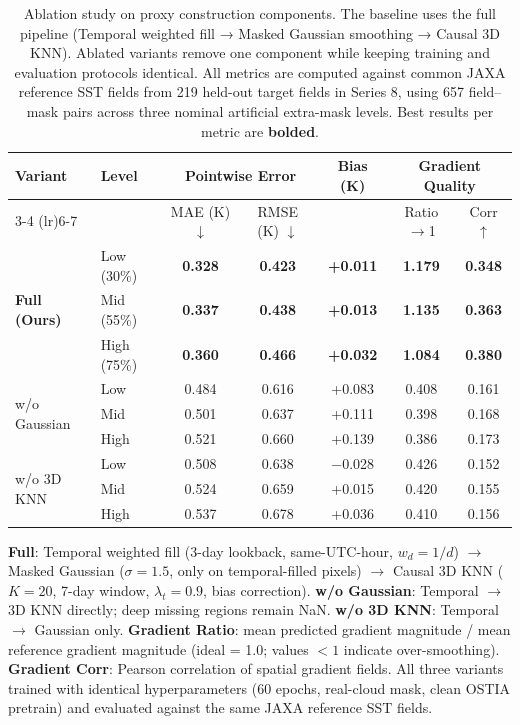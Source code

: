 
\begin{table}[htbp]
\centering
\caption{Ablation study on proxy construction components. The baseline uses the full pipeline (Temporal weighted fill → Masked Gaussian smoothing → Causal 3D KNN). Ablated variants remove one component while keeping training and evaluation protocols identical. All metrics are computed against common JAXA reference SST fields from 219 held-out target fields in Series 8, using 657 field--mask pairs across three nominal artificial extra-mask levels. Best results per metric are \textbf{bolded}.}
\label{tab:proxy_ablation}
\small
\begin{tabular}{@{}llccccc@{}}
\toprule
\multirow{2}{*}{Variant} & \multirow{2}{*}{Level} & \multicolumn{2}{c}{Pointwise Error} & \multirow{2}{*}{Bias (K)} & \multicolumn{2}{c}{Gradient Quality} \\
\cmidrule(lr){3-4} \cmidrule(lr){6-7}
& & MAE (K) $\downarrow$ & RMSE (K) $\downarrow$ & & Ratio $\to$1 & Corr $\uparrow$ \\
\midrule
\multirow{3}{*}{\textbf{Full (Ours)}}
& Low (30\%)  & \textbf{0.328} & \textbf{0.423} & \textbf{+0.011} & \textbf{1.179} & \textbf{0.348} \\
& Mid (55\%)  & \textbf{0.337} & \textbf{0.438} & \textbf{+0.013} & \textbf{1.135} & \textbf{0.363} \\
& High (75\%) & \textbf{0.360} & \textbf{0.466} & \textbf{+0.032} & \textbf{1.084} & \textbf{0.380} \\
\midrule
\multirow{3}{*}{w/o Gaussian}
& Low  & 0.484 & 0.616 & +0.083 & 0.408 & 0.161 \\
& Mid  & 0.501 & 0.637 & +0.111 & 0.398 & 0.168 \\
& High & 0.521 & 0.660 & +0.139 & 0.386 & 0.173 \\
\midrule
\multirow{3}{*}{w/o 3D KNN}
& Low  & 0.508 & 0.638 & $-$0.028 & 0.426 & 0.152 \\
& Mid  & 0.524 & 0.659 & +0.015 & 0.420 & 0.155 \\
& High & 0.537 & 0.678 & +0.036 & 0.410 & 0.156 \\
\bottomrule
\end{tabular}

\vspace{0.5em}
\footnotesize
\textbf{Full}: Temporal weighted fill (3-day lookback, same-UTC-hour, $w_d=1/d$) $\to$ Masked Gaussian ($\sigma=1.5$, only on temporal-filled pixels) $\to$ Causal 3D KNN ($K=20$, 7-day window, $\lambda_t=0.9$, bias correction). \textbf{w/o Gaussian}: Temporal $\to$ 3D KNN directly; deep missing regions remain NaN. \textbf{w/o 3D KNN}: Temporal $\to$ Gaussian only. \textbf{Gradient Ratio}: mean predicted gradient magnitude / mean reference gradient magnitude (ideal = 1.0; values $<1$ indicate over-smoothing). \textbf{Gradient Corr}: Pearson correlation of spatial gradient fields. All three variants trained with identical hyperparameters (60 epochs, real-cloud mask, clean OSTIA pretrain) and evaluated against the same JAXA reference SST fields.
\end{table}
